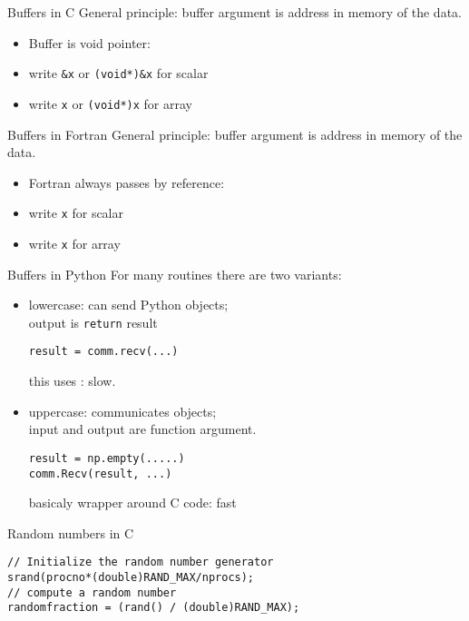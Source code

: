 \begin{numberedframe}{Buffers in C}
  General principle: buffer argument is address in memory of the data.
  \begin{itemize}
  \item Buffer is void pointer: 
  \item write \lstinline{&x} or \lstinline{(void*)&x} for scalar
  \item write \lstinline{x} or \lstinline{(void*)x} for array
  \end{itemize}
\end{numberedframe}

\begin{numberedframe}{Buffers in Fortran}
  General principle: buffer argument is address in memory of the data.
  \begin{itemize}
  \item Fortran always passes by reference:
  \item write \lstinline{x} for scalar
  \item write \lstinline{x} for array
  \end{itemize}
\end{numberedframe}

\begin{numberedframe}{Buffers in Python}
  For many routines there are two variants:
  \begin{itemize}
  \item lowercase: can send Python objects;\\
    output is \lstinline{return} result\\
\begin{verbatim}
result = comm.recv(...)
\end{verbatim}
    this uses : slow.
  \item uppercase: communicates  objects;\\
    input and output are function argument.
\begin{verbatim}
result = np.empty(.....)
comm.Recv(result, ...)
\end{verbatim}
    basicaly wrapper around C code: fast
  \end{itemize}
\end{numberedframe}

\begin{exerciseframe}[randommax]
  
\end{exerciseframe}

\begin{numberedframe}{Random numbers in C}
\lstset{language=C}
\begin{lstlisting}
// Initialize the random number generator
srand(procno*(double)RAND_MAX/nprocs);
// compute a random number
randomfraction = (rand() / (double)RAND_MAX);
\end{lstlisting}
\end{numberedframe}

